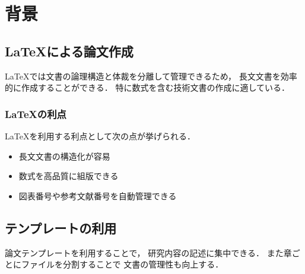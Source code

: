 
\chapter{背景}

\section{\LaTeX{}による論文作成}

\LaTeX{}では文書の論理構造と体裁を分離して管理できるため，
長文文書を効率的に作成することができる．
特に数式を含む技術文書の作成に適している．

\subsection{\LaTeX{}の利点}

\LaTeX{}を利用する利点として次の点が挙げられる．

\begin{itemize}
    \item 長文文書の構造化が容易
    \item 数式を高品質に組版できる
    \item 図表番号や参考文献番号を自動管理できる
\end{itemize}

\section{テンプレートの利用}

論文テンプレートを利用することで，
研究内容の記述に集中できる．
また章ごとにファイルを分割することで
文書の管理性も向上する．
